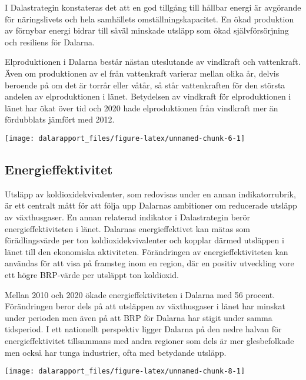 \documentclass[
]{article}
\begin{document}
I Dalastrategin konstateras det att en god tillgång till hållbar energi
är avgörande för näringslivets och hela samhällets
omställningskapacitet. En ökad produktion av förnybar energi bidrar till
såväl minskade utsläpp som ökad självförsörjning och resiliens för
Dalarna.

Elproduktionen i Dalarna består nästan uteslutande av vindkraft och
vattenkraft. Även om produktionen av el från vattenkraft varierar mellan
olika år, delvis beroende på om det är torrår eller våtår, så står
vattenkraften för den största andelen av elproduktionen i länet.
Betydelsen av vindkraft för elproduktionen i länet har ökat över tid och
2020 hade elproduktionen från vindkraft mer än fördubblats jämfört med
2012.

\begin{center}\texttt{[image: dalarapport\_files/figure-latex/unnamed-chunk-6-1]} \end{center}

\hypertarget{energieffektivitet}{%
\subsection{Energieffektivitet}\label{energieffektivitet}}

Utsläpp av koldioxidekvivalenter, som redovisas under en annan
indikatorrubrik, är ett centralt mått för att följa upp Dalarnas
ambitioner om reducerade utsläpp av växthusgaser. En annan relaterad
indikator i Dalastrategin berör energieffektiviteten i länet. Dalarnas
energieffektivet kan mätas som förädlingsvärde per ton
koldioxidekvivalenter och kopplar därmed utsläppen i länet till den
ekonomiska aktiviteten. Förändringen av energieffektiviteten kan
användas för att visa på framsteg inom en region, där en positiv
utveckling vore ett högre BRP-värde per utsläppt ton koldioxid.

Mellan 2010 och 2020 ökade energieffektiviteten i Dalarna med 56
procent. Förändringen beror dels på att utsläppen av växthusgaser i
länet har minskat under perioden men även på att BRP för Dalarna har
stigit under samma tidsperiod. I ett nationellt perspektiv ligger
Dalarna på den nedre halvan för energieffektivitet tillsammans med andra
regioner som dels är mer glesbefolkade men också har tunga industrier,
ofta med betydande utsläpp.

\begin{center}\texttt{[image: dalarapport\_files/figure-latex/unnamed-chunk-8-1]} \end{center}
\end{document}
